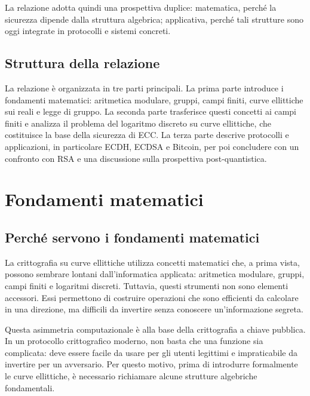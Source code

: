 \documentclass[12pt,a4paper,oneside]{report}
\begin{document}
La relazione adotta quindi una prospettiva duplice: matematica, perché la sicurezza dipende dalla struttura algebrica; applicativa, perché tali strutture sono oggi integrate in protocolli e sistemi concreti.

\section{Struttura della relazione}

La relazione è organizzata in tre parti principali. La prima parte introduce i fondamenti matematici: aritmetica modulare, gruppi, campi finiti, curve ellittiche sui reali e legge di gruppo. La seconda parte trasferisce questi concetti ai campi finiti e analizza il problema del logaritmo discreto su curve ellittiche, che costituisce la base della sicurezza di ECC. La terza parte descrive protocolli e applicazioni, in particolare ECDH, ECDSA e Bitcoin, per poi concludere con un confronto con RSA e una discussione sulla prospettiva post-quantistica.

\chapter{Fondamenti matematici}

\section{Perché servono i fondamenti matematici}

La crittografia su curve ellittiche utilizza concetti matematici che, a prima vista, possono sembrare lontani dall'informatica applicata: aritmetica modulare, gruppi, campi finiti e logaritmi discreti. Tuttavia, questi strumenti non sono elementi accessori. Essi permettono di costruire operazioni che sono efficienti da calcolare in una direzione, ma difficili da invertire senza conoscere un'informazione segreta.

Questa asimmetria computazionale è alla base della crittografia a chiave pubblica. In un protocollo crittografico moderno, non basta che una funzione sia complicata: deve essere facile da usare per gli utenti legittimi e impraticabile da invertire per un avversario. Per questo motivo, prima di introdurre formalmente le curve ellittiche, è necessario richiamare alcune strutture algebriche fondamentali.
\end{document}
